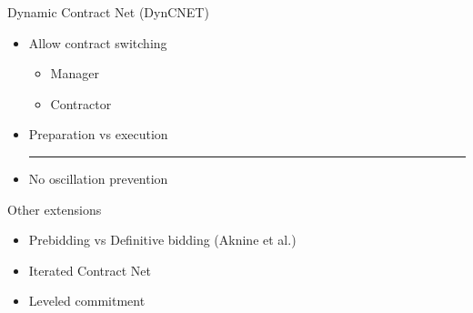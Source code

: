 \documentclass{beamer}
\begin{document}
	\begin{frame}{Dynamic Contract Net (DynCNET)}
		\begin{itemize}
			\item Allow contract switching
				\begin{itemize}
				\item Manager
				\item Contractor
				\end{itemize}
			\item Preparation vs execution
			\hrule
			\item No oscillation prevention
		\end{itemize}
	\end{frame}
	
	\begin{frame}{Other extensions}
		\begin{itemize}
			\item Prebidding vs Definitive bidding (Aknine et al.)
			\item Iterated Contract Net
			\item Leveled commitment
		\end{itemize}
	\end{frame}
	
\end{document}
